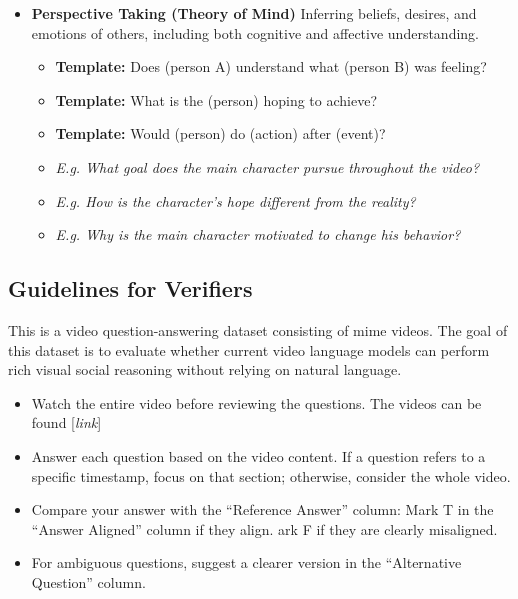 \begin{tcolorbox}[colframe=black, colback=white, arc=3mm, boxrule=1pt, width=\linewidth, title=\textbf{Annotation Instructions}, breakable]
\begin{itemize}
        \item \textbf{Perspective Taking (Theory of Mind)} Inferring beliefs, desires, and emotions of others, including both cognitive and affective understanding.
        \begin{itemize}
            \item \textbf{Template:} Does (person A) understand what (person B) was feeling?
            \item \textbf{Template:} What is the (person) hoping to achieve?
            \item \textbf{Template:} Would (person) do (action) after (event)? 
            \item \textit{E.g. What goal does the main character pursue throughout the video?}
            \item \textit{E.g. How is the character’s hope different from the reality?}
            \item \textit{E.g. Why is the main character motivated to change his behavior?}
        \end{itemize}
    \end{itemize}
\end{tcolorbox}

\subsection{Guidelines for Verifiers}

\begin{tcolorbox}[colframe=black, colback=white, arc=3mm, boxrule=1pt, width=\linewidth, title=\textbf{Verification Instructions}, breakable]
This is a video question-answering dataset consisting of mime videos. The goal of this dataset is to evaluate whether current video language models can perform rich visual social reasoning without relying on natural language. 
\begin{itemize}
    \item Watch the entire video before reviewing the questions. The videos can be found [\textit{link}]
    \item Answer each question based on the video content. If a question refers to a specific timestamp, focus on that section; otherwise, consider the whole video.
    \item Compare your answer with the “Reference Answer” column: Mark T in the “Answer Aligned” column if they align. ark F if they are clearly misaligned.
    \item For ambiguous questions, suggest a clearer version in the “Alternative Question” column.
\end{itemize}
\end{tcolorbox}